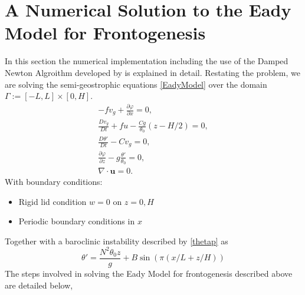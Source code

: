 \chapter{A Numerical Solution to the Eady Model for Frontogenesis \label{algorithm}}
In this section the numerical implementation including the use of the Damped Newton Algroithm developed by \cite{Merigot2017} is explained in detail. 
Restating the problem, we are solving the semi-geostrophic equations \ref{EadyModel} over the domain $\Gamma := [-L,L] \times [0,H]$.
\begin{equation*}
	\begin{aligned}
		-fv_g + \frac{\partial \varphi}{\partial x} = 0,\\
		\frac{Dv_g}{Dt} + fu -\frac{Cg}{\theta _0}\left(z-H/2\right) = 0,\\
		\frac{D\theta'}{Dt} - Cv_g = 0,\\
		\frac{\partial \varphi}{\partial z} - g\frac{\theta'}{\theta_0} = 0,\\
		\nabla \cdot \bm{u} = 0.
	\end{aligned}
\end{equation*}
With boundary conditions:
\vspace{-\topsep}
\begin{itemize}
	\setlength{\parskip}{0pt}
	\setlength{\itemsep}{0pt}
	\item Rigid lid condition $w = 0$ on $z = 0, H$
	\item Periodic boundary conditions in $x$
\end{itemize}
\vspace{-\topsep}
Together with a baroclinic instability described by \ref{thetap} as
\begin{equation}
\theta' = \frac{N^2\theta_0 z}{g} + B\sin\left(\pi\left(x/L + z/H\right)\right)
\end{equation}
The steps involved in solving the Eady Model for frontogenesis described above are detailed below,

